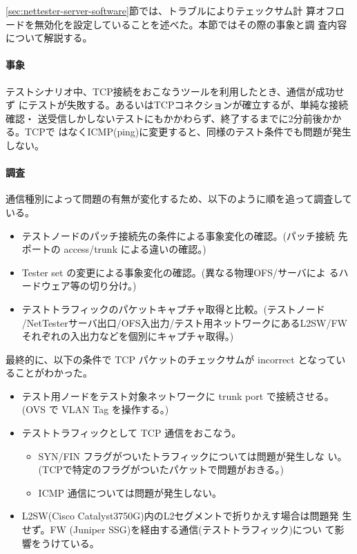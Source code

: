 \ref{sec:nettester-server-software}節では、トラブルによりテェックサム計
算オフロードを無効化を設定していることを述べた。本節ではその際の事象と調
査内容について解説する。

    \paragraph{事象}
テストシナリオ中、TCP接続をおこなうツールを利用したとき、通信が成功せず
にテストが失敗する。あるいはTCPコネクションが確立するが、単純な接続確認・
送受信しかしないテストにもかかわらず、終了するまでに2分前後かかる。TCPで
はなくICMP(ping)に変更すると、同様のテスト条件でも問題が発生しない。

    \paragraph{調査}
通信種別によって問題の有無が変化するため、以下のように順を追って調査して
いる。
\begin{itemize}
 \item テストノードのパッチ接続先の条件による事象変化の確認。(パッチ接続
       先ポートの access/trunk による違いの確認。)
 \item Tester set の変更による事象変化の確認。(異なる物理OFS/サーバによ
       るハードウェア等の切り分け。)
 \item テストトラフィックのパケットキャプチャ取得と比較。(テストノード
       /NetTesterサーバ出口/OFS入出力/テスト用ネットワークにあるL2SW/FW
       それぞれの入出力などを個別にキャプチャ取得。)
\end{itemize}

最終的に、以下の条件で TCP パケットのチェックサムが incorrect となってい
ることがわかった。
\begin{itemize}
 \item テスト用ノードをテスト対象ネットワークに trunk port で接続させる。
       (OVS で VLAN Tag を操作する。)
 \item テストトラフィックとして TCP 通信をおこなう。
       \begin{itemize}
        \item SYN/FIN フラグがついたトラフィックについては問題が発生しな
              い。(TCPで特定のフラグがついたパケットで問題がおきる。)
        \item ICMP 通信については問題が発生しない。
       \end{itemize}
 \item L2SW(Cisco Catalyst3750G)内のL2セグメントで折りかえす場合は問題発
       生せず。FW (Juniper SSG)を経由する通信(テストトラフィック)につい
       て影響をうけている。
\end{itemize}

